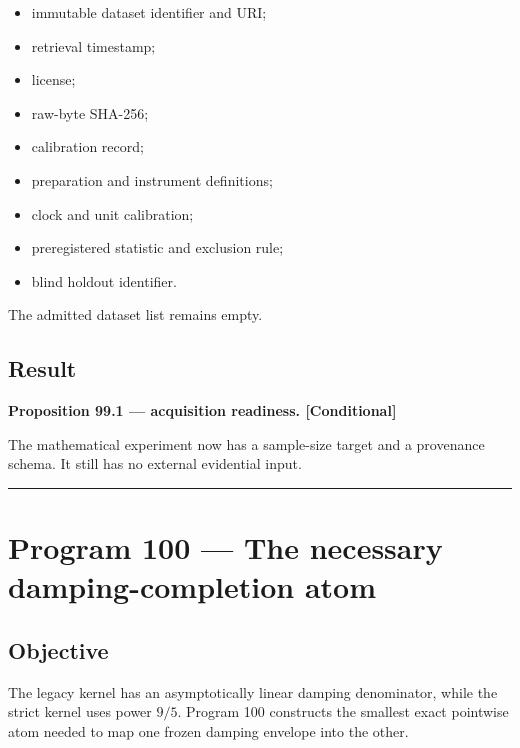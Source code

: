 \documentclass[11pt,a4paper,openany]{report}
\newcommand{\statusConditional}{\textcolor{finorange}{[Conditional]}}
\begin{document}
\begin{itemize}
\item 
immutable dataset identifier and URI;

\item 
retrieval timestamp;

\item 
license;

\item 
raw-byte SHA-256;

\item 
calibration record;

\item 
preparation and instrument definitions;

\item 
clock and unit calibration;

\item 
preregistered statistic and exclusion rule;

\item 
blind holdout identifier.

\end{itemize}

The admitted dataset list remains empty.

\section{Result}

\textbf{Proposition 99.1 --- acquisition readiness. \statusConditional{}}

The mathematical experiment now has a sample-size target and a provenance schema. It still has no external evidential input.

\par\medskip\hrule\medskip

\chapter{Program 100 --- The necessary damping-completion atom}

\section{Objective}

The legacy kernel has an asymptotically linear damping denominator, while the strict kernel uses power \(9/5\). Program 100 constructs the smallest exact pointwise atom needed to map one frozen damping envelope into the other.
\end{document}
